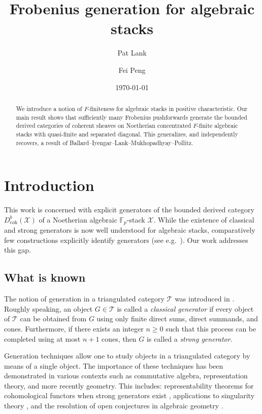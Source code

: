 \documentclass[11pt]{amsart}
\title[Frobenius generation for algebraic stacks]{Frobenius generation for algebraic stacks}
\author[P.~Lank]{Pat Lank}
\author[F. ~Peng]{Fei Peng}
\date{\today}
\theoremstyle{plain}
\theoremstyle{definition}
\numberwithin{equation}{section}
\numberwithin{theorem}{section}
\begin{document}
    
\begin{abstract}
    We introduce a notion of $F$-finiteness for algebraic stacks in positive characteristic. 
    Our main result shows that sufficiently many Frobenius pushforwards generate the bounded derived categories of coherent sheaves on Noetherian concentrated $F$-finite algebraic stacks with quasi-finite and separated diagonal. 
    This generalizes, and independently recovers, a result of Ballard--Iyengar--Lank--Mukhopadhyay--Pollitz.
\end{abstract}

\maketitle

\tableofcontents

\section{Introduction}
\label{sec:intro}

This work is concerned with explicit generators of the bounded derived category $D^b_{\operatorname{coh}}(\mathcal{X})$ of a Noetherian algebraic $\mathbb{F}_p$-stack $\mathcal{X}$. 
While the existence of classical and strong generators is now well understood for algebraic stacks, comparatively few constructions explicitly identify generators (see e.g.\ \cite{Hanlon/Hicks/Lazarev:2024}).
Our work addresses this gap.

\subsection{What is known}
\label{sec:intro_known}

The notion of generation in a triangulated category $\mathcal{T}$ was introduced in \cite{Bondal/VandenBergh:2003}. 
Roughly speaking, an object $G \in \mathcal{T}$ is called a \textit{classical generator} if every object of $\mathcal{T}$ can be obtained from $G$ using only finite direct sums, direct summands, and cones. 
Furthermore, if there exists an integer $n \geq 0$ such that this process can be completed using at most $n+1$ cones, then $G$ is called a \textit{strong generator}.

Generation techniques allow one to study objects in a triangulated category by means of a single object. 
The importance of these techniques has been demonstrated in various contexts such as commutative algebra, representation theory, and more recently geometry. This includes: representability theorems for cohomological functors when strong generators exist \cite{Rouquier:2008}, applications to singularity theory \cite{Lank/Venkatesh:2025,Lank/McDonald/Venkatesh:2025,DeDeyn/Lank/Lank/ManaliRahul/Venkatesh:2026}, and the resolution of open conjectures in algebraic geometry \cite{Neeman:2021a,Neeman:2022}. 
\end{document}
